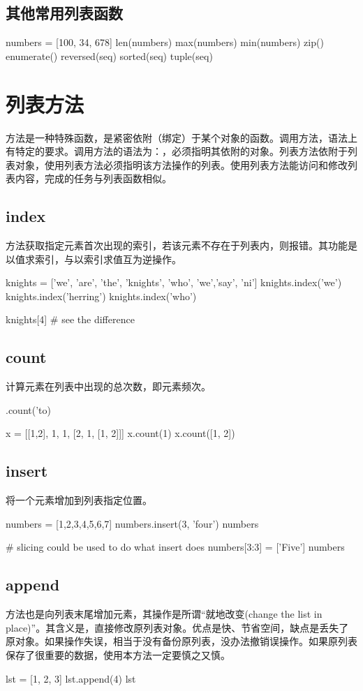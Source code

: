 \subsection{其他常用列表函数}
\begin{python}
numbers = [100, 34, 678]
len(numbers)
max(numbers)
min(numbers)
zip()
enumerate()
reversed(seq)
sorted(seq)
tuple(seq)
\end{python}

\section{列表方法}
方法是一种特殊函数，是紧密依附（绑定）于某个对象的函数。调用方法，语法上有特定的要求。调用方法的语法为：，必须指明其依附的对象。列表方法依附于列表对象，使用列表方法必须指明该方法操作的列表。使用列表方法能访问和修改列表内容，完成的任务与列表函数相似。
\subsection{index}
方法获取指定元素首次出现的索引，若该元素不存在于列表内，则报错。其功能是以值求索引，与以索引求值互为逆操作。
\begin{python}
knights = ['we', 'are', 'the', 'knights', 'who', 'we','say', 'ni']
knights.index('we')
knights.index('herring')
knights.index('who')

knights[4] # see the difference
\end{python}
\subsection{count}
计算元素在列表中出现的总次数，即元素频次。
\begin{python}
['to', 'be', 'or', 'not', 'to', 'be'].count('to)

x = [[1,2], 1, 1, [2, 1, [1, 2]]]
x.count(1)
x.count([1, 2])
\end{python}
\subsection{insert}
将一个元素增加到列表指定位置。
\begin{python}
numbers = [1,2,3,4,5,6,7]
numbers.insert(3, 'four')
numbers

# slicing could be used to do what insert does
numbers[3:3] = ['Five']
numbers
\end{python}
\subsection{append}
方法也是向列表末尾增加元素，其操作是所谓“就地改变(change the list in place)”。其含义是，直接修改原列表对象。优点是快、节省空间，缺点是丢失了原对象。如果操作失误，相当于没有备份原列表，没办法撤销误操作。如果原列表保存了很重要的数据，使用本方法一定要慎之又慎。
\begin{python}
lst = [1, 2, 3]
lst.append(4)
lst
\end{python}
